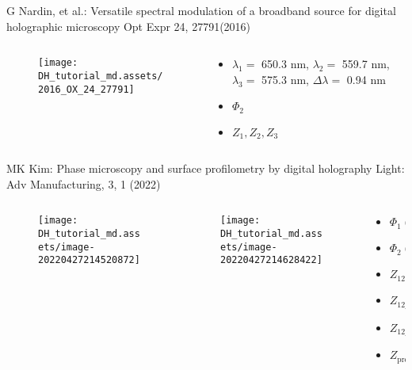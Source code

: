 \documentclass[t, aspectratio=169]{beamer}
\begin{document}
\begin{frame}{G Nardin, et al.: Versatile spectral modulation of a broadband source for digital holographic microscopy}
	\vspace{-3 mm}
	\small Opt Expr 24, 27791(2016)
	\begin{columns}
		\begin{column}{.6\textwidth}
			\vspace{-5 mm}
			\begin{figure}
				\texttt{[image: DH\_tutorial\_md.assets/2016\_OX\_24\_27791]}
			\end{figure}
		\end{column}
		\begin{column}{.4\textwidth}
			\begin{itemize}
				\item[a) ] $\lambda_1 = $ 650.3 nm, $ \lambda_2 = $ 559.7 nm, $ \lambda_3 = $ 575.3 nm, $ \Delta\lambda = $ 0.94 nm
				\item[b) ] $ \Phi_2 $
				\item[c) ] $ Z_1, Z_2, Z_3 $
			\end{itemize}
		\end{column}
	\end{columns}
\end{frame}


\begin{frame}{MK Kim: Phase microscopy and surface profilometry by digital holography}
	\vspace{-3 mm}
	\small Light: Adv Manufacturing, 3, 1 (2022)
	\begin{columns}
		\begin{column}{.47\textwidth}
			\begin{figure}
				\texttt{[image: DH\_tutorial\_md.assets/image-20220427214520872]}
			\end{figure}
		\end{column}
		\begin{column}{.28\textwidth}
			\begin{figure}
				\texttt{[image: DH\_tutorial\_md.assets/image-20220427214628422]}
			\end{figure}
		\end{column}
		\begin{column}{.25\textwidth}
			\begin{itemize}
				\item[a) ] $ \Phi_1(x,y) $
				\item[b) ] $ \Phi_2(x,y) $
				\item[c) ] $ Z_{12}(x,y) $
				\item[d) ] $ Z_{12\_3}(x,y) $
				\item[e) ] $ Z_{12\_4}(x,y) $
				\item[f) ] $ Z_{\textrm{proc}}(x,y) $
			\end{itemize}
		\end{column}
	\end{columns}
\end{frame}
\end{document}
